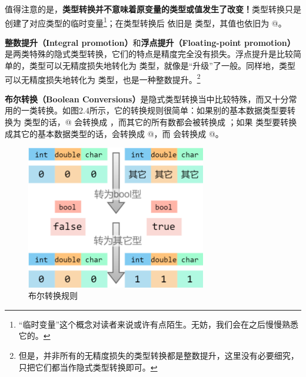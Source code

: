 值得注意的是，\textbf{类型转换并不意味着原变量的类型或值发生了改变！}类型转换只是创建了对应类型的临时变量\footnote{``临时变量''这个概念对读者来说或许有点陌生。无妨，我们会在之后慢慢熟悉它的。}；在类型转换后 \lstinline@d@ 依旧是 \lstinline@double@ 类型，其值也依旧为 @。\par
\textbf{整数提升（Integral promotion）}和\textbf{浮点提升（Floating-point promotion）}是两类特殊的隐式类型转换，它们的特点是精度完全没有损失。浮点提升是比较简单的，\lstinline@float@ 类型可以无精度损失地转化为 \lstinline@double@ 类型，就像是``升级''了一般。同样地，\lstinline@char@ 类型可以无精度损失地转化为 \lstinline@int@ 类型，也是一种整数提升。\footnote{但是，并非所有的无精度损失的类型转换都是整数提升，这里没有必要细究，只把它们都当作隐式类型转换即可。}\par
\label{con:boolean_conversions}
\textbf{布尔转换（Boolean Conversions）}是隐式类型转换当中比较特殊，而又十分常用的一类转换。如图2.4所示，它的转换规则很简单：如果别的基本数据类型要转换为 \lstinline@bool@ 类型的话，@ 会转换成 \lstinline@false@，而其它的所有数都会被转换成 \lstinline@true@；如果 \lstinline@bool@ 类型要转换成其它的基本数据类型的话，\lstinline@false@ 会转换成 @，而 \lstinline@true@ 会转换成 @。\par
\begin{figure}[htbp]
    \centering
    \includegraphics[width=0.7\textwidth]{../images/generalized_parts/02_boolean_conversion.drawio.png}
    \caption{布尔转换规则}
\end{figure}
